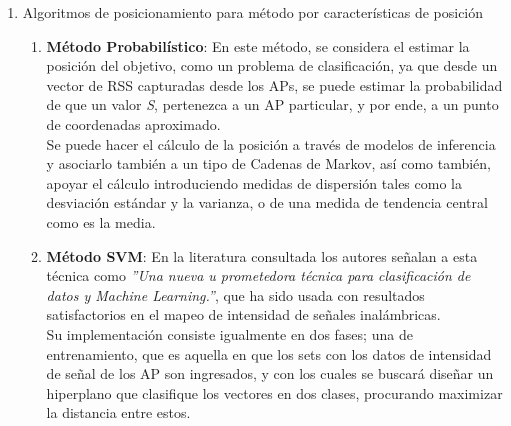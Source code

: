 \begin{itemize}
{\begin{enumerate}
        \item{Algoritmos de posicionamiento para método por características de posición}\\
        
            \begin{enumerate}
                \item {\textbf{Método Probabilístico}: En este método, se considera el estimar la posición del objetivo, como un problema de clasificación, ya que desde un vector de RSS capturadas desde los APs, se puede estimar la probabilidad de que un valor \textit{S}, pertenezca a un AP particular, y por ende, a un punto de coordenadas aproximado. \\
                
                Se puede hacer el cálculo de la posición a través de modelos de inferencia y asociarlo también a un tipo de Cadenas de Markov, así como también, apoyar el cálculo introduciendo medidas de dispersión tales como la desviación estándar y la varianza, o de una medida de tendencia central como es la media.\\
                }
                
                \clearpage 
                
                \item{\textbf{Método \ac{SVM}}: \label{SVM} En la literatura consultada \cite{7} los autores señalan a esta técnica como \textit{''Una nueva u prometedora técnica para clasificación de datos y Machine Learning.''}, que ha sido usada con resultados satisfactorios en el mapeo de intensidad de señales inalámbricas.\\
                
                Su implementación consiste igualmente en dos fases; una de entrenamiento, que es aquella en que los sets con los datos de  intensidad de señal de los AP son ingresados, y con los cuales se buscará diseñar un hiperplano que clasifique los vectores en dos clases, procurando maximizar la distancia entre estos.\\
                
}
\end{enumerate}
\end{enumerate}}
\end{itemize}

